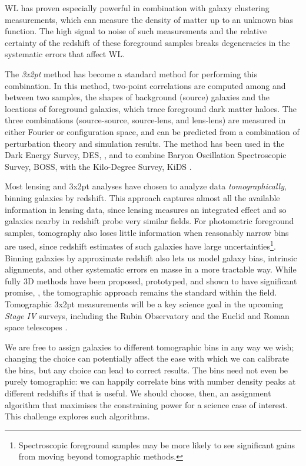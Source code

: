 \documentclass[twocolumn,twocolappendix]{aastex63}
\begin{document}
WL has proven especially powerful in combination with galaxy clustering measurements,
which can measure the density of matter up to an unknown bias function.  The high signal
to noise of such measurements and the relative certainty of the redshift of these foreground
samples breaks degeneracies in the systematic errors that affect WL.

The \emph{3x2pt} method has become a standard method for performing this combination.
In this method, two-point correlations are computed among and between two samples, the shapes of 
background (source) galaxies and the locations of foreground galaxies, which trace foreground
dark matter haloes.  The three combinations (source-source, source-lens, and lens-lens) are
measured in either Fourier or configuration space, and can be predicted from a combination of 
perturbation theory and simulation results.  The method has been used in the Dark Energy Survey, DES, 
\citep{des-3x2pt}, and to combine Baryon Oscillation Spectroscopic Survey, BOSS, with the Kilo-Degree 
Survey, KiDS \citep{kids-3x2pt}.

Most lensing and 3x2pt analyses have chosen to analyze data \emph{tomographically}, 
binning galaxies by redshift.
This approach captures almost all the available information in lensing data, since lensing measures
an integrated effect and so galaxies nearby in redshift probe very similar fields.  For photometric
foreground samples, tomography also loses little information when reasonably narrow bins are used,
since redshift estimates of such galaxies have
large uncertainties\footnote{Spectroscopic foreground samples may be more likely to see significant 
gains from moving beyond tomographic methods.}.  Binning galaxies by approximate redshift also lets us 
model galaxy bias, intrinsic alignments, and other systematic errors en masse in a more tractable way.
While fully 3D methods have been proposed, prototyped, and shown to have significant promise, 
\citep{heavens,kitching}, the tomographic approach remains the standard within the field.
Tomographic 3x2pt measurements will be a key science goal in the upcoming \emph{Stage IV} surveys,
including the Rubin Observatory \citep{rubin} and the Euclid and Roman space telescopes
\citep{euclid,roman}.

We are free to assign galaxies to different tomographic bins in any way we wish; changing the choice
can potentially affect the ease with which we can calibrate
the bins, but any choice can lead to correct results. The bins need not even be purely tomographic: we can happily correlate bins with number density peaks at different redshifts if that is useful.
We should choose, then, an assignment algorithm that maximises the constraining power for a science
case of interest.  This challenge explores such algorithms.
\end{document}
